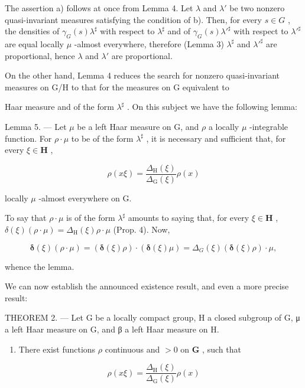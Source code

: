The assertion a) follows at once from Lemma 4. Let \(\lambda\) and \(\lambda'\) be two nonzero quasi-invariant measures satisfying the condition of b). Then, for every \(s \in G\) , the densities of \(\gamma_G(s)\lambda^\sharp\) with respect to \(\lambda^\sharp\) and of \(\gamma_G(s)\lambda'^\sharp\) with respect to \(\lambda'^\sharp\) are equal locally \(\mu\) -almost everywhere, therefore (Lemma 3) \(\lambda^\sharp\) and \(\lambda'^\sharp\) are proportional, hence \(\lambda\) and \(\lambda'\) are proportional.

On the other hand, Lemma 4 reduces the search for nonzero quasi-invariant measures on G/H to that for the measures on G equivalent to

Haar measure and of the form \(\lambda^{\sharp}\) . On this subject we have the following lemma:

Lemma 5. --- Let \(\mu\) be a left Haar measure on G, and \(\rho\) a locally \(\mu\) -integrable function. For \(\rho \cdot \mu\) to be of the form \(\lambda^{\sharp}\) , it is necessary and sufficient that, for every \(\xi \in \mathbf{H}\) ,

\[
\rho (x \xi) = \frac {\Delta_ {\mathrm{H}} (\xi)}{\Delta_ {\mathrm{G}} (\xi)} \rho (x)\tag{18}
\]

locally \(\mu\) -almost everywhere on G.

To say that \(\rho \cdot \mu\) is of the form \(\lambda^{\sharp}\) amounts to saying that, for every \(\xi \in \mathbf{H}\) , \(\delta(\xi)(\rho \cdot \mu) = \Delta_{\mathrm{H}}(\xi)\rho \cdot \mu\) (Prop. 4). Now,

\[
\boldsymbol {\delta} (\xi) (\rho \cdot \mu) = (\boldsymbol {\delta} (\xi) \rho) \cdot (\boldsymbol {\delta} (\xi) \mu) = \Delta_ {G} (\xi) (\boldsymbol {\delta} (\xi) \rho) \cdot \mu ,
\]

whence the lemma.

We can now establish the announced existence result, and even a more precise result:

THEOREM 2. --- Let G be a locally compact group, H a closed subgroup of G, μ a left Haar measure on G, and β a left Haar measure on H.

\begin{enumerate}
\def\labelenumi{\alph{enumi})}
\tightlist
\item
  There exist functions \(\rho\) continuous and \(>0\) on \(\mathbf{G}\) , such that
\end{enumerate}

\[
\rho (x \xi) = \frac {\Delta_ {\mathrm{H}} (\xi)}{\Delta_ {\mathrm{G}} (\xi)} \rho (x)
\]

